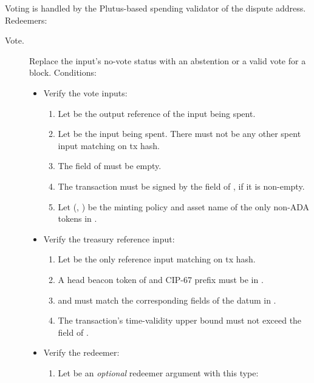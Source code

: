\documentclass[../hydrozoa.tex]{subfiles}
\begin{document}
Voting is handled by the Plutus-based spending validator of the dispute address.
Redeemers:
\begin{description}
  \item[Vote.] Replace the input's no-vote status with an abstention or a valid vote for a block. Conditions:
    \begin{itemize}
      \item Verify the vote inputs:
        \begin{enumerate}
          \item Let  be the output reference of the input being spent.
          \item Let  be the input being spent.
            There must not be any other spent input matching  on tx hash.
          \item The  field of  must be empty.
          \item The transaction must be signed by the  field of , if it is non-empty.
          \item Let (, ) be the minting policy and asset name of the only non-ADA tokens in .
        \end{enumerate}
      \item Verify the treasury reference input:
        \begin{enumerate}[resume]
          \item Let  be the only reference input matching  on tx hash.
          \item A head beacon token of  and CIP-67 prefix  must be in .
          \item {} and  must match the corresponding fields of the  datum in .
          \item The transaction's time-validity upper bound must not exceed the  field of .
        \end{enumerate}
      \item Verify the redeemer:
        \begin{enumerate}[resume]
          \item Let  be an \emph{optional} redeemer argument with this type:
            \begin{equation*}
            \begin{split}

\end{split}
\end{equation*}
\end{enumerate}
\end{itemize}
\end{description}
\end{document}
